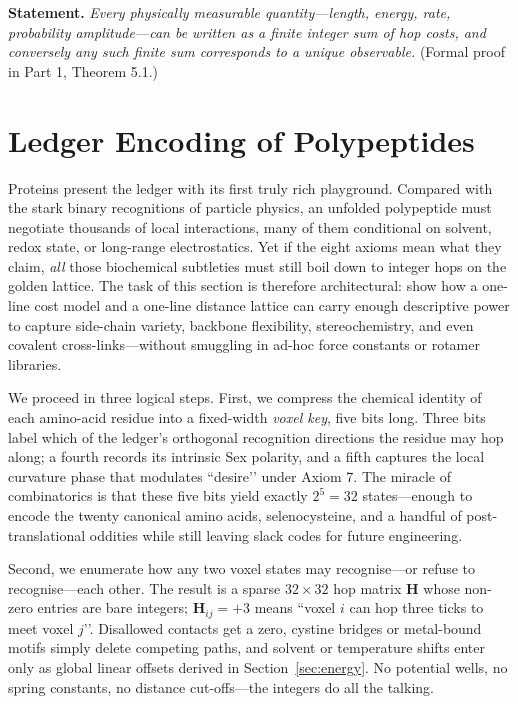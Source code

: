 \documentclass[11pt]{article}
\begin{document}
\noindent\textbf{Statement.}  
\emph{Every physically measurable quantity—length, energy, rate,
probability amplitude—can be written as a finite integer sum of hop
costs, and conversely any such finite sum corresponds to a unique
observable.}  (Formal proof in Part 1, Theorem 5.1.)

\section{Ledger Encoding of Polypeptides}\label{sec:voxel}

Proteins present the ledger with its first truly rich playground.
Compared with the stark binary recognitions of particle physics, an
unfolded polypeptide must negotiate thousands of local interactions,
many of them conditional on solvent, redox state, or long-range
electrostatics.  Yet if the eight axioms mean what they claim, \emph{all}
those biochemical subtleties must still boil down to integer hops on the
golden lattice.  The task of this section is therefore architectural:
show how a one-line cost model and a one-line distance lattice can carry
enough descriptive power to capture side-chain variety, backbone
flexibility, stereochemistry, and even covalent cross-links—without
smuggling in ad-hoc force constants or rotamer libraries.

We proceed in three logical steps.  First, we compress the chemical
identity of each amino-acid residue into a fixed-width \emph{voxel key},
five bits long.  Three bits label which of the ledger’s orthogonal
recognition directions the residue may hop along; a fourth records its
intrinsic Sex polarity, and a fifth captures the local curvature phase
that modulates “desire’’ under Axiom 7.  The miracle of combinatorics is
that these five bits yield exactly \(2^{5}=32\) states—enough to encode
the twenty canonical amino acids, selenocysteine, and a handful of
post-translational oddities while still leaving slack codes for future
engineering.

Second, we enumerate how any two voxel states may recognise—or refuse
to recognise—each other.  The result is a sparse \(32\times32\) hop
matrix \(\mathbf H\) whose non-zero entries are bare integers;
\(\mathbf H_{ij}=+3\) means “voxel \(i\) can hop three ticks to meet
voxel \(j\)’’.  Disallowed contacts get a zero, cystine bridges or
metal-bound motifs simply delete competing paths, and solvent or
temperature shifts enter only as global linear offsets derived in
Section~\ref{sec:energy}.  No potential wells, no spring constants, no
distance cut-offs—the integers do all the talking.
\end{document}
